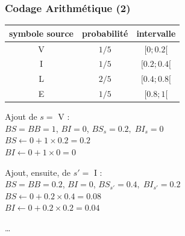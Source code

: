 \documentclass[aspectratio=43]{beamer}
\begin{document}
\begin{frame}
    \frametitle{Codage Arithmétique (2)}

    {
    \centering
    \begin{tabular}{c | c | c}
        symbole source & probabilité & intervalle  \\
        \hline
        V & $1/5$ & $[0; 0.2[$ \\ 
        I & $1/5$ & $[0.2; 0.4[$\\
        L & $2/5$ & $[0.4; 0.8[$\\
        E & $1/5$ & $[0.8; 1[$\\ \hline
    \end{tabular}\par
    }
    
    \vspace*{1em}

    Ajout de $s = $ V : \\
    $BS = BB = 1$, $BI = 0$, $BS_s = 0.2,\; BI_s = 0$ \\
    $BS \leftarrow 0 + 1 \times 0.2 = 0.2$ \\
    $BI \leftarrow 0 + 1 \times 0 = 0$ \\

    \vspace*{1em}

    Ajout, ensuite, de $s'=$ I : \\
    $BS = BB = 0.2$, $BI = 0$, $BS_{s'} = 0.4, \; BI_{s'} = 0.2$ \\
    $BS \leftarrow 0 + 0.2 \times 0.4 = 0.08$ \\
    $BI \leftarrow 0 + 0.2 \times 0.2 = 0.04$ \\

    \vspace*{0.5em}

    \dots
\end{frame}
\end{document}
